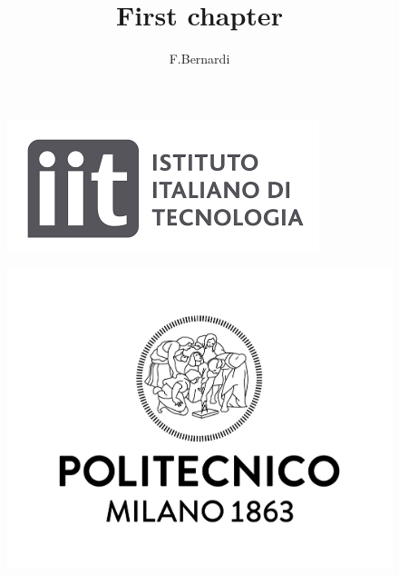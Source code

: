 \documentclass[a4paper]{article}
\title{First chapter}
\author{F.Bernardi}
\begin{document}
		\maketitle
		
		\begin{minipage}{\linewidth}
			\centering
			\begin{minipage}{0.45\linewidth}
				\begin{figure}[H]
					\includegraphics[width=\linewidth]{Logo_IIT.png}
					
				\end{figure}
			\end{minipage}
			\hspace{0.05\linewidth}
			\begin{minipage}{0.45\linewidth}
				\begin{figure}[H]
					\includegraphics[width=\linewidth]{Logo_Politecnico_Milano.jpg}
					
				\end{figure}
			\end{minipage}
		\end{minipage}
	
\end{document}
